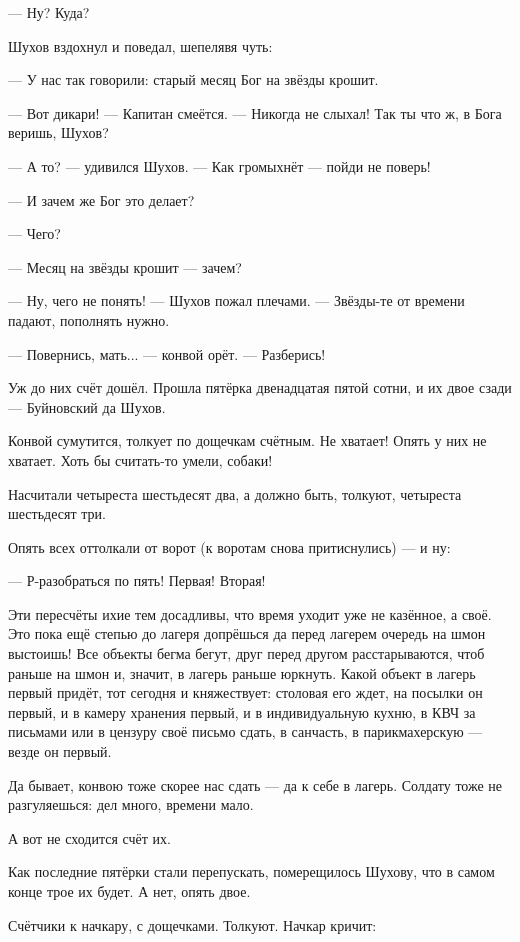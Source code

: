 --- Ну? Куда?

Шухов вздохнул и поведал, шепелявя чуть:

--- У нас так говорили: старый месяц Бог на звёзды крошит.

--- Вот дикари! --- Капитан смеётся. --- Никогда не слыхал! Так ты что ж, в Бога веришь, Шухов?

--- А то? --- удивился Шухов. --- Как громыхнёт --- пойди не поверь!

--- И зачем же Бог это делает?

--- Чего?

--- Месяц на звёзды крошит --- зачем?

--- Ну, чего не понять! --- Шухов пожал плечами. --- Звёзды-те от времени падают, пополнять нужно.

--- Повернись, мать... --- конвой орёт. --- Разберись!

Уж до них счёт дошёл. Прошла пятёрка двенадцатая пятой сотни, и их двое сзади --- Буйновский да
Шухов.

Конвой сумутится, толкует по дощечкам счётным. Не хватает! Опять у них не хватает. Хоть бы
считать-то умели, собаки!

Насчитали четыреста шестьдесят два, а должно быть, толкуют, четыреста шестьдесят три.

Опять всех оттолкали от ворот (к воротам снова притиснулись) --- и ну:

--- Р-разобраться по пять! Первая! Вторая!

Эти пересчёты ихие тем досадливы, что время уходит уже не казённое, а своё. Это пока ещё
степью до лагеря допрёшься да перед лагерем очередь на шмон выстоишь! Все объекты бегма
бегут, друг перед другом расстарываются, чтоб раньше на шмон и, значит, в лагерь раньше
юркнуть. Какой объект в лагерь первый придёт, тот сегодня и княжествует: столовая его ждет,
на посылки он первый, и в камеру хранения первый, и в индивидуальную кухню, в КВЧ за письмами
или в цензуру своё письмо сдать, в санчасть, в парикмахерскую --- везде он первый.

Да бывает, конвою тоже скорее нас сдать --- да к себе в лагерь. Солдату тоже не разгуляешься:
дел много, времени мало.

А вот не сходится счёт их.

Как последние пятёрки стали перепускать, померещилось Шухову, что в самом конце трое их
будет. А нет, опять двое.

Счётчики к начкару, с дощечками. Толкуют. Начкар кричит:

